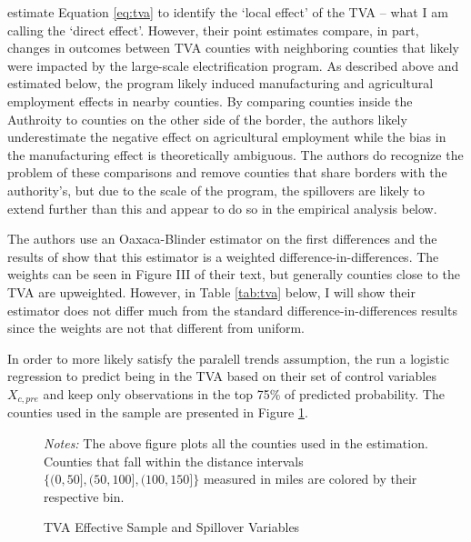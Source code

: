 \documentclass[11pt]{article}
\begin{document}
\citet{Kline_Moretti_2014} estimate Equation \ref{eq:tva} to identify the `local effect' of the TVA -- what I am calling the `direct effect'. However, their point estimates compare, in part, changes in outcomes between TVA counties with neighboring counties that likely were impacted by the large-scale electrification program. As described above and estimated below, the program likely induced manufacturing and agricultural employment effects in nearby counties. By comparing counties inside the Authroity to counties on the other side of the border, the authors likely underestimate the negative effect on agricultural employment while the bias in the manufacturing effect is theoretically ambiguous. The authors do recognize the problem of these comparisons and remove counties that share borders with the authority's, but due to the scale of the program, the spillovers are likely to extend further than this and appear to do so in the empirical analysis below.  

The authors use an Oaxaca-Blinder estimator on the first differences and the results of \citet{Kline_2011} show that this estimator is a weighted difference-in-differences. The weights can be seen in Figure III of their text, but generally counties close to the TVA are upweighted. However, in Table \ref{tab:tva} below, I will show their estimator does not differ much from the standard difference-in-differences results since the weights are not that different from uniform. 

In order to more likely satisfy the paralell trends assumption, the run a logistic regression to predict being in the TVA based on their set of control variables $X_{c, pre}$ and keep only observations in the top 75\% of predicted probability. The counties used in the sample are presented in Figure \ref{fig:tva_sample}. 

\begin{figure}[tbh!]
    \caption{TVA Effective Sample and Spillover Variables}
    \label{fig:tva_sample}

    {\centering
    }

    {\footnotesize \textit{Notes:} The above figure plots all the counties used in the estimation. Counties that fall within the distance intervals $\{(0, 50], (50, 100], (100, 150]\}$ measured in miles are colored by their respective bin.}
\end{figure}
\end{document}
